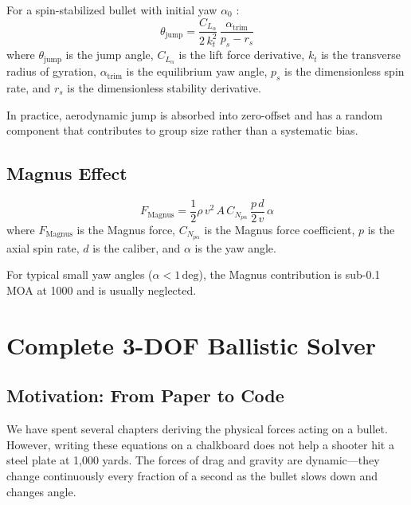 \documentclass[11pt,twoside,openright]{report}
\begin{document}
For a spin-stabilized bullet with initial yaw $\alpha_0$ \citep{mccoy1999modern}:
\begin{equation}
  \theta_{\mathrm{jump}} = \frac{C_{L_\alpha}}{2\,k_t^2}\,\frac{\alpha_{\mathrm{trim}}}{p_s - r_s}
  \label{eq:aero_jump}
\end{equation}
where $\theta_{\mathrm{jump}}$ is the jump angle, $C_{L_\alpha}$ is the lift force derivative, $k_t$ is the transverse radius of gyration, $\alpha_{\mathrm{trim}}$ is the equilibrium yaw angle, $p_s$ is the dimensionless spin rate, and $r_s$ is the dimensionless stability derivative.

In practice, aerodynamic jump is absorbed into zero-offset and has a random component that contributes to group size rather than a systematic bias.

\section{Magnus Effect}

\begin{equation}
  F_{\mathrm{Magnus}} = \frac{1}{2}\rho\,v^2\,A\,C_{N_{p\alpha}}\,\frac{p\,d}{2\,v}\,\alpha
  \label{eq:magnus}
\end{equation}
where $F_{\mathrm{Magnus}}$ is the Magnus force, $C_{N_{p\alpha}}$ is the Magnus force coefficient, $p$ is the axial spin rate, $d$ is the caliber, and $\alpha$ is the yaw angle.

For typical small yaw angles ($\alpha < 1\,\text{deg}$), the Magnus contribution is sub-0.1 MOA at \SI{1000}{\yard} and is usually neglected.


\chapter{Complete 3-DOF Ballistic Solver}
\label{ch:solver}

\section{Motivation: From Paper to Code}

We have spent several chapters deriving the physical forces acting on a bullet. However, writing these equations on a chalkboard does not help a shooter hit a steel plate at 1,000 yards. The forces of drag and gravity are dynamic—they change continuously every fraction of a second as the bullet slows down and changes angle.
\end{document}
